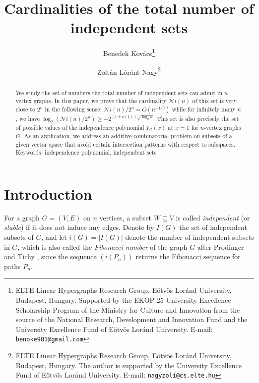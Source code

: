 \documentclass[10pt,a4paper]{article}
\title{Cardinalities of the total number of independent sets}
\author{Benedek Kovács\thanks{ELTE Linear Hypergraphs Research Group, Eötvös Loránd University, Budapest, Hungary. Supported by the EKÖP-25 University Excellence Scholarship Program of the Ministry for Culture and Innovation from the source of the National Research, Development and Innovation Fund and the University Excellence Fund of Eötvös Loránd University.
		E-mail: {\tt benoke981@gmail.com}}
	\and Zolt\'an L\'or\'ant Nagy\thanks{ELTE Linear Hypergraphs  Research Group,
		E\"otv\"os Lor\'and University, Budapest, Hungary. The author is supported by the University Excellence Fund of Eötvös Loránd University.	E-mail: {\tt nagyzoli@cs.elte.hu}}
  }
\date{}
\numberwithin{equation}{section}
\begin{document}
\maketitle

\begin{abstract}
We study the set of numbers the total number of independent sets can admit in $n$-vertex graphs. In this paper, we prove that the cardinality $\mathcal{N}i(n)$ of this set is very close to $2^n$ in the following sense: $\mathcal{N}i(n)/2^n= O(n^{-1/5})$ while  for infinitely many $n$, we have  $\log_2(\mathcal{N}i(n)/2^n)\geq -2^{(1+o(1))\sqrt{\log_2 n}}$. This set is also precisely the set of possible values of the independence polynomial $I_G(x)$ at $x=1$ for $n$-vertex graphs $G$. As an application, we address an additive combinatorial problem on subsets of a given vector space
that avoid certain intersection patterns with respect to subspaces.
\\
    Keywords: independence polynomial, independent sets
\end{abstract}

\section{Introduction}


For a graph $G=(V,E)$ on $n$ vertices, a subset $W\subseteq V$ is called \textit{independent} (or \textit{stable}) if it does not induce any edges. Denote by $I(G)$ the set of independent subsets of $G$, and let $i(G)=|I(G)|$ denote the number of independent subsets in $G$, which is also called the \textit{Fibonacci number} of the graph $G$ after Prodinger and Tichy \cite{Fibonacci}, since the sequence $(i(P_n))$ returns the Fibonacci sequence for paths $P_n$.
\end{document}

